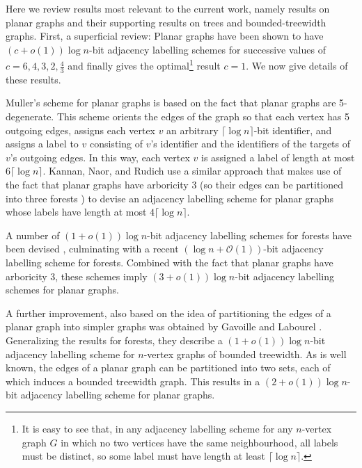\documentclass[kpfonts]{patmorin}
\newcommand{\pnote}[1]{\ \newline\noindent\fcolorbox{red}{yellow}{\begin{minipage}{\textwidth}#1\end{minipage}}}
\newcommand{\Oh}{\mathcal{O}}
\begin{document}
Here we review results most relevant to the current work, namely results on planar graphs and their supporting results on trees and bounded-treewidth graphs.  First, a superficial review: Planar graphs have been shown to have $(c+o(1))\log n$-bit adjacency labelling schemes for successive values of $c=6,4,3,2,\tfrac{4}{3}$ and finally  gives the optimal\footnote{It is easy to see that, in any adjacency labelling scheme for any $n$-vertex graph $G$ in which no two vertices have the same neighbourhood, all labels must be distinct, so some label must have length at least $\lceil\log n\rceil$.} result $c=1$.  We now give details of these results.

Muller's scheme for planar graphs \cite{muller:local} is based on the fact that planar graphs are 5-degenerate.  This scheme orients the edges of the graph so that each vertex has 5 outgoing edges, assigns each vertex $v$ an arbitrary $\lceil\log n\rceil$-bit identifier, and assigns a label to $v$ consisting of $v$'s identifier and the identifiers of the targets of $v$'s outgoing edges.  In this way, each vertex $v$ is assigned a label of length at most $6\lceil\log n\rceil$.  Kannan, Naor, and Rudich \cite{kannan.naor.ea:implicit} use a similar approach that makes use of the fact that planar graphs have arboricity 3 (so their edges can be partitioned into three forests \cite{nash-williams:edge-disjoint}) to devise an adjacency labelling scheme for planar graphs whose labels have length at most $4\lceil\log n\rceil$.

A number of $(1+o(1))\log n$-bit adjacency labelling schemes for forests have been devised \cite{chung:universal, alstrup.rauhe:improved,alstrup.dahlgaard.ea:optimal}, culminating with a recent $(\log n + \Oh(1))$-bit adjacency labelling scheme \cite{alstrup.dahlgaard.ea:optimal} for forests.  Combined with the fact that planar graphs have arboricity 3, these schemes imply $(3+o(1))\log n$-bit adjacency labelling schemes for planar graphs.

A further improvement, also based on the idea of partitioning the edges of a planar graph into simpler graphs was obtained by Gavoille and Labourel \cite{gavoille.labourel:shorter}.  Generalizing the results for forests, they describe a $(1+o(1))\log n$-bit adjacency labelling scheme for $n$-vertex graphs of bounded treewidth. As is well known, the edges of a planar graph can be partitioned into two sets, each of which induces a bounded treewidth graph.
This results in a $(2+o(1))\log n$-bit adjacency labelling scheme for planar graphs.
\end{document}
